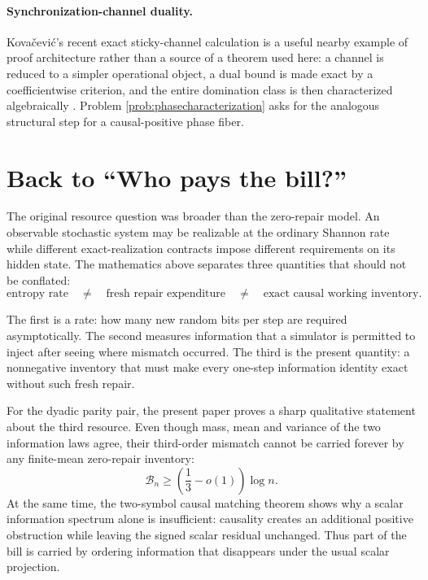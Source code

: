\documentclass[11pt,a4paper]{article}
\theoremstyle{definition}
\theoremstyle{remark}
\newcommand{\cB}{\mathcal B}
\begin{document}
\paragraph{Synchronization-channel duality.}
Kova\v{c}evi\'c's recent exact sticky-channel calculation is a useful nearby
example of proof architecture rather than a source of a theorem used here:
a channel is reduced to a simpler operational object, a dual bound is made
exact by a coefficientwise criterion, and the entire domination class is then
characterized algebraically \cite{Kovacevic2026}.  Problem
\ref{prob:phasecharacterization} asks for the analogous structural step for a
causal-positive phase fiber.

\section{Back to ``Who pays the bill?''}
\label{sec:original}

The original resource question was broader than the zero-repair model.  An
observable stochastic system may be realizable at the ordinary Shannon rate
while different exact-realization contracts impose different requirements on
its hidden state.  The mathematics above separates three quantities that
should not be conflated:
\begin{equation}
 \boxed{
 \text{entropy rate}
 \quad\neq\quad
 \text{fresh repair expenditure}
 \quad\neq\quad
 \text{exact causal working inventory}.
 }
 \label{eq:threebills}
\end{equation}

The first is a rate: how many new random bits per step are required
asymptotically.  The second measures information that a simulator is permitted
to inject after seeing where mismatch occurred.  The third is the present
quantity: a nonnegative inventory that must make every one-step information
identity exact without such fresh repair.

For the dyadic parity pair, the present paper proves a sharp qualitative
statement about the third resource.  Even though mass, mean and variance of
the two information laws agree, their third-order mismatch cannot be carried
forever by any finite-mean zero-repair inventory:
\begin{equation}
 \cB_n\ge\left(\frac13-o(1)\right)\log n.
 \label{eq:backbill}
\end{equation}
At the same time, the two-symbol causal matching theorem shows why a scalar
information spectrum alone is insufficient: causality creates an additional
positive obstruction while leaving the signed scalar residual unchanged.
Thus part of the bill is carried by ordering information that disappears under
the usual scalar projection.
\end{document}
